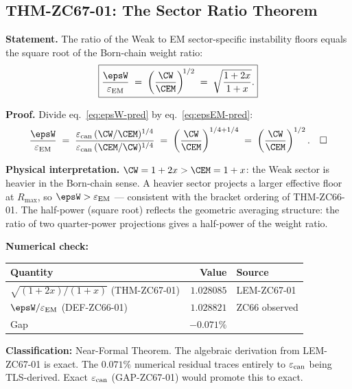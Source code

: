 \documentclass[12pt, a4paper]{article}
\renewcommand{\epsEM}{\varepsilon_{\rm EM}}
\renewcommand{\epscan}{\varepsilon_{\rm can}}
\begin{document}
\subsection{THM-ZC67-01: The Sector Ratio Theorem}
\label{sec:thm}


\begin{formalbox}[title={THM-ZC67-01: Sector Ratio Theorem
  ($R_0$, Near-Formal)}]

\textbf{Statement.}
The ratio of the Weak to EM sector-specific instability floors
equals the square root of the Born-chain weight ratio:
\begin{equation}
  \boxed{
  \frac{\epsW}{\epsEM}
  \;=\;
  \left(\frac{\CW}{\CEM}\right)^{\!1/2}
  \;=\;
  \sqrt{\frac{1+2x}{1+x}}.
  }
  \label{eq:ratio-thm}
\end{equation}

\textbf{Proof.}
Divide eq.~\eqref{eq:epsW-pred} by eq.~\eqref{eq:epsEM-pred}:
\[
  \frac{\epsW}{\epsEM}
  \;=\;
  \frac{\epscan\,(\CW/\CEM)^{1/4}}{\epscan\,(\CEM/\CW)^{1/4}}
  \;=\;
  \left(\frac{\CW}{\CEM}\right)^{1/4+1/4}
  \;=\;
  \left(\frac{\CW}{\CEM}\right)^{1/2}.
  \quad\square
\]

\textbf{Physical interpretation.}
$\CW = 1+2x > \CEM = 1+x$: the Weak sector is heavier in the
Born-chain sense.
A heavier sector projects a larger effective floor at $R_{\max}$,
so $\epsW > \epsEM$ --- consistent with the bracket ordering
of THM-ZC66-01.
The half-power (square root) reflects the geometric averaging
structure: the ratio of two quarter-power projections gives
a half-power of the weight ratio.

\textbf{Numerical check:}
\begin{center}
\renewcommand{\arraystretch}{1.25}
\begin{tabular}{@{}lrl@{}}
\toprule
Quantity & Value & Source \\
\midrule
$\sqrt{(1+2x)/(1+x)}$ (THM-ZC67-01) & $1.028085$ & LEM-ZC67-01 \\
$\epsW/\epsEM$ (DEF-ZC66-01)         & $1.028821$ & ZC66 observed \\
Gap                                   & $-0.071\%$ & \\
\bottomrule
\end{tabular}
\end{center}

\textbf{Classification:} Near-Formal Theorem.
The algebraic derivation from LEM-ZC67-01 is exact.
The $0.071\%$ numerical residual traces entirely to $\epscan$
being TLS-derived.
Exact $\epscan$ (GAP-ZC67-01) would promote this to exact.
\end{formalbox}
\end{document}
